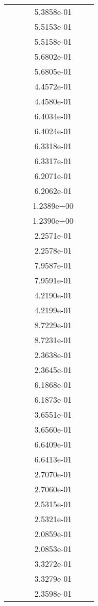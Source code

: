\begin{xltabular}{\textwidth}{r|rS[table-format=1.3e+2]S[table-format=1.4e+2]S[table-format=1.4e+2]S[table-format=-1.5]}
&  &  & 5.3858e-01 & & \\
&  &  & 5.5153e-01 & & \\
&  &  & 5.5158e-01 & & \\
&  &  & 5.6802e-01 & & \\
&  &  & 5.6805e-01 & & \\
&  &  & 4.4572e-01 & & \\
&  &  & 4.4580e-01 & & \\
&  &  & 6.4034e-01 & & \\
&  &  & 6.4024e-01 & & \\
&  &  & 6.3318e-01 & & \\
&  &  & 6.3317e-01 & & \\
&  &  & 6.2071e-01 & & \\
&  &  & 6.2062e-01 & & \\
&  &  & 1.2389e+00 & & \\
&  &  & 1.2390e+00 & & \\
&  &  & 2.2571e-01 & & \\
&  &  & 2.2578e-01 & & \\
&  &  & 7.9587e-01 & & \\
&  &  & 7.9591e-01 & & \\
&  &  & 4.2190e-01 & & \\
&  &  & 4.2199e-01 & & \\
&  &  & 8.7229e-01 & & \\
&  &  & 8.7231e-01 & & \\
&  &  & 2.3638e-01 & & \\
&  &  & 2.3645e-01 & & \\
&  &  & 6.1868e-01 & & \\
&  &  & 6.1873e-01 & & \\
&  &  & 3.6551e-01 & & \\
&  &  & 3.6560e-01 & & \\
&  &  & 6.6409e-01 & & \\
&  &  & 6.6413e-01 & & \\
&  &  & 2.7070e-01 & & \\
&  &  & 2.7060e-01 & & \\
&  &  & 2.5315e-01 & & \\
&  &  & 2.5321e-01 & & \\
&  &  & 2.0859e-01 & & \\
&  &  & 2.0853e-01 & & \\
&  &  & 3.3272e-01 & & \\
&  &  & 3.3279e-01 & & \\
&  &  & 2.3598e-01 & & \\

\end{xltabular}

